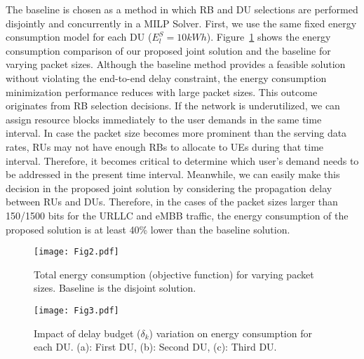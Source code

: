\documentclass[conference]{IEEEtran}
\begin{document}
\par The baseline is chosen as a method in which RB and DU selections are performed disjointly and concurrently in a MILP Solver. First, we use the same fixed energy consumption model for each DU ($E_{l}^S = 10kWh$). Figure~\ref{fig:obj} shows the energy consumption comparison of our proposed joint solution and the baseline for varying packet sizes. Although the baseline method provides a feasible solution without violating the end-to-end delay constraint, the energy consumption minimization performance reduces with large packet sizes. This outcome originates from RB selection decisions. If the network is underutilized, we can assign resource blocks immediately to the user demands in the same time interval. In case the packet size becomes more prominent than the serving data rates, RUs may not have enough RBs to allocate to UEs during that time interval. Therefore, it becomes critical to determine which user's demand needs to be addressed in the present time interval. Meanwhile, we can easily make this decision in the proposed joint solution by considering the propagation delay between RUs and DUs. Therefore, in the cases of the packet sizes larger than 150/1500 bits for the URLLC and eMBB traffic, the energy consumption of the proposed solution is at least 40\% lower than the baseline solution.
\begin{figure}
\centering
\texttt{[image: Fig2.pdf]}
\caption{\label{fig:obj} Total energy consumption (objective function) for varying packet sizes. Baseline is the disjoint solution.}
\end{figure}
\begin{figure*}
\centering
\texttt{[image: Fig3.pdf]}
\caption{\label{fig:delay} Impact of delay budget ($\delta_{k}$) variation on energy consumption for each DU. (a): First DU, (b): Second DU, (c): Third DU. }
\end{figure*}
\end{document}
